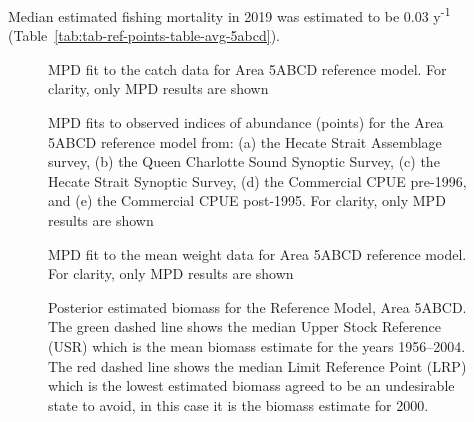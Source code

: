 \documentclass[11pt]{book}
\begin{document}
Median estimated fishing mortality in 2019 was estimated to be 0.03 y\textsuperscript{-1} (Table~\ref{tab:tab-ref-points-table-avg-5abcd}).
\begin{figure}[htb]

{\centering {} 

}

\caption{MPD fit to the catch data for Area 5ABCD reference model. For clarity, only MPD results are shown}\label{fig:summary-fig-base-catch-fit-5abcd}
\end{figure}
\begin{figure}[htb]

{\centering {} 

}

\caption{MPD fits to observed indices of abundance (points) for the Area 5ABCD reference model from: (a) the Hecate Strait Assemblage survey, (b) the Queen Charlotte Sound Synoptic Survey, (c) the Hecate Strait Synoptic Survey, (d) the Commercial CPUE pre-1996, and (e) the Commercial CPUE post-1995. For clarity, only MPD results are shown}\label{fig:summary-fig-base-index-fits-5abcd}
\end{figure}
\begin{figure}[htb]

{\centering {} 

}

\caption{MPD fit to the mean weight data for Area 5ABCD reference model. For clarity, only MPD results are shown}\label{fig:summary-fig-base-mean-weight-5abcd}
\end{figure}
\begin{figure}[htb]

{\centering {} 

}

\caption{Posterior estimated biomass for the Reference Model, Area 5ABCD.  The green dashed line shows the median Upper Stock Reference (USR) which is the mean biomass estimate for the years 1956--2004. The red dashed line shows the median Limit Reference Point (LRP) which is the lowest estimated biomass agreed to be an undesirable state to avoid, in this case it is the biomass estimate for 2000.}\label{fig:summary-fig-base-biomass-5abcd}
\end{figure}
\end{document}
